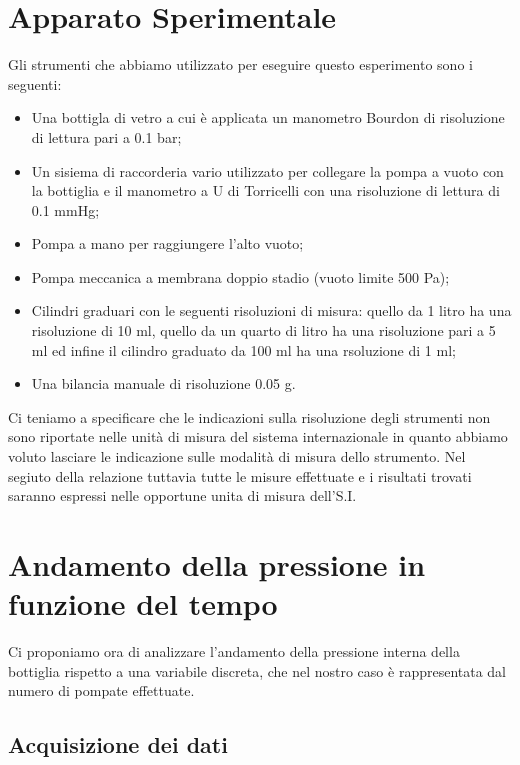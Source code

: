 \section{Apparato Sperimentale}

Gli strumenti che abbiamo utilizzato per eseguire questo esperimento sono i seguenti:
\begin{itemize}
	\item{Una bottigla di vetro a cui è applicata un manometro Bourdon di risoluzione di lettura pari a 0.1 bar;}
	\item{Un sisiema di raccorderia vario utilizzato per collegare la pompa a vuoto con la bottiglia e il manometro a U di Torricelli con una risoluzione di lettura di 0.1 mmHg;}
	\item{Pompa a mano per raggiungere l'alto vuoto;}
	\item{Pompa meccanica a membrana doppio stadio (vuoto limite 500 Pa);}
	\item{Cilindri graduari con le seguenti risoluzioni di misura: quello da 1 litro ha una risoluzione di 10 ml, quello da un quarto di litro ha una risoluzione pari a 5 ml ed infine il cilindro graduato da 100 ml ha una rsoluzione di 1 ml;}
	\item{Una bilancia manuale di risoluzione 0.05 g.}
\end{itemize}

Ci teniamo a specificare che le indicazioni sulla risoluzione degli strumenti non sono riportate nelle unità di misura del sistema internazionale in quanto abbiamo voluto lasciare le indicazione sulle modalità di misura dello strumento. Nel segiuto della relazione tuttavia tutte le misure effettuate e i risultati trovati saranno espressi nelle opportune unita di misura dell'S.I.

\section{Andamento della pressione in funzione del tempo}

Ci proponiamo ora di analizzare l'andamento della pressione interna della bottiglia rispetto a una variabile discreta, che nel nostro caso è rappresentata dal numero di pompate effettuate.

\subsection{Acquisizione dei dati}

